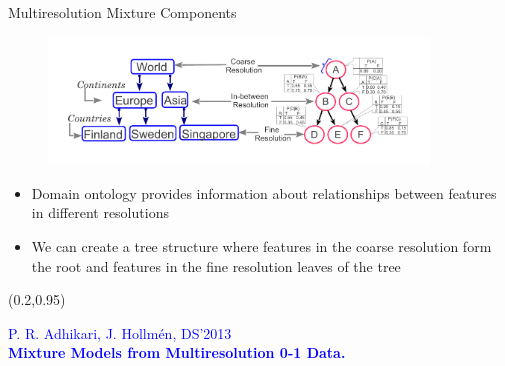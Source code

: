 \documentclass[first=dgreen,second=purple,logo=redexc]{aaltoslides}
\newcommand\FrameText[1]{%
  \begin{textblock*}{0.98\textwidth}(0.2\textwidth,0.95\textheight)
    \textcolor {blue}{\scriptsize\raggedright #1\hspace{0.1\textwidth}}
  \end{textblock*}}
\begin{document}
\begin{frame} {Multiresolution Mixture Components} 

      \begin{figure}
      \centering
      \includegraphics[trim=1cm 1cm 1cm 0cm, clip=true, width=0.9\textwidth]{figures/bnnfig1}
      \end{figure}
      
      \begin{itemize}\setlength{\itemsep}{2.5mm}
\item Domain ontology provides information about relationships between features in different resolutions
\item We can create a tree structure where features in the coarse resolution form the root and features in the fine resolution leaves of the tree
\end{itemize}
\FrameText{P. R. Adhikari, J. Hollm{\'e}n, DS'2013 \\ \vspace{-2mm} \textbf{Mixture Models from Multiresolution 0-1 Data.}}
\end{frame}


% 
%       
%       
% 
% 
% 
\end{document}

